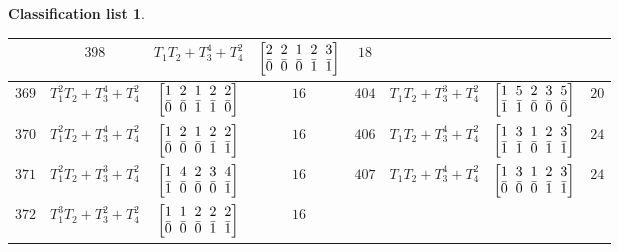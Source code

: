 \documentclass[10pt,a4paper]{amsart}
\theoremstyle{definition}
\newtheorem{class-list}[thm]{Classification list}
\numberwithin{equation}{section}
\begin{document}
\begin{class-list}
\begin{table}[h!]
\begin{tabu}{c|c|c|c||c|c|c|c}
&${398}$&${T_{1}T_{2}+T_{3}^{4}+T_{4}^{2}}$
&$\arraycolsep=1mm\begin{bmatrix}{2} & {2} & {1} & {2} & {3} \\ {\bar{0}} & {\bar{0}} & {\bar{0}} & {\bar{1}} & {\bar{1}}\end{bmatrix}$&${18}$
\\
\hline
${369}$&${T_{1}^{2}T_{2}+T_{3}^{4}+T_{4}^{2}}$
&$\arraycolsep=1mm\begin{bmatrix}{1} & {2} & {1} & {2} & {2} \\ {\bar{0}} & {\bar{0}} & {\bar{1}} & {\bar{1}} & {\bar{0}}\end{bmatrix}$&${16}$
&${404}$&${T_{1}T_{2}+T_{3}^{3}+T_{4}^{2}}$
&$\arraycolsep=1mm\begin{bmatrix}{1} & {5} & {2} & {3} & {5} \\ {\bar{1}} & {\bar{1}} & {\bar{0}} & {\bar{0}} & {\bar{0}}\end{bmatrix}$&${20}$
\\
\hline
${370}$&${T_{1}^{2}T_{2}+T_{3}^{4}+T_{4}^{2}}$
&$\arraycolsep=1mm\begin{bmatrix}{1} & {2} & {1} & {2} & {2} \\ {\bar{0}} & {\bar{0}} & {\bar{0}} & {\bar{1}} & {\bar{1}}\end{bmatrix}$&${16}$
&${406}$&${T_{1}T_{2}+T_{3}^{4}+T_{4}^{2}}$
&$\arraycolsep=1mm\begin{bmatrix}{1} & {3} & {1} & {2} & {3} \\ {\bar{1}} & {\bar{1}} & {\bar{0}} & {\bar{1}} & {\bar{1}}\end{bmatrix}$&${24}$
\\
\hline
${371}$&${T_{1}^{2}T_{2}+T_{3}^{3}+T_{4}^{2}}$
&$\arraycolsep=1mm\begin{bmatrix}{1} & {4} & {2} & {3} & {4} \\ {\bar{1}} & {\bar{0}} & {\bar{0}} & {\bar{0}} & {\bar{1}}\end{bmatrix}$&${16}$
&${407}$&${T_{1}T_{2}+T_{3}^{4}+T_{4}^{2}}$
&$\arraycolsep=1mm\begin{bmatrix}{1} & {3} & {1} & {2} & {3} \\ {\bar{0}} & {\bar{0}} & {\bar{0}} & {\bar{1}} & {\bar{1}}\end{bmatrix}$&${24}$
\\
\hline
${372}$&${T_{1}^{3}T_{2}+T_{3}^{2}+T_{4}^{2}}$
&$\arraycolsep=1mm\begin{bmatrix}{1} & {1} & {2} & {2} & {2} \\ {\bar{0}} & {\bar{0}} & {\bar{0}} & {\bar{1}} & {\bar{1}}\end{bmatrix}$&${16}$

\end{tabu}
\end{table}
\end{class-list}
\end{document}
